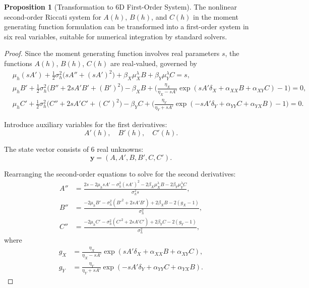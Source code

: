 \documentclass{article}
\theoremstyle{definition}
\newtheorem{proposition}{Proposition}[section]
\begin{document}
\begin{proposition}[Transformation to 6D First-Order System]
\label{prop:6d_transform}
The nonlinear second-order Riccati system for $A(h)$, $B(h)$, and $C(h)$ in the moment generating function formulation can be transformed into a first-order system in six real variables, suitable for numerical integration by standard solvers.
\end{proposition}

\begin{proof}
Since the moment generating function involves real parameters $s$, the functions $A(h)$, $B(h)$, $C(h)$ are real-valued, governed by
\[
\begin{aligned}
& \mu_h (s A') 
+ \tfrac{1}{2}\sigma_h^2 \big( s A'' + (s A')^2 \big)
+ \beta_X \mu_X^\lambda B 
+ \beta_Y \mu_Y^\lambda C 
= s, \\[0.8ex]
& \mu_h B' 
+ \tfrac{1}{2}\sigma_h^2 \big( B'' + 2 s A' B' + (B')^2 \big)
- \beta_X B 
+ \Big( \tfrac{\eta_X}{\eta_X - s A'} 
\exp\!\left( s A' \delta_X + \alpha_{XX} B + \alpha_{XY} C \right) - 1 \Big) 
= 0, \\[0.8ex]
& \mu_h C' 
+ \tfrac{1}{2}\sigma_h^2 \big( C'' + 2 s A' C' + (C')^2 \big)
- \beta_Y C 
+ \Big( \tfrac{\eta_Y}{\eta_Y + s A'} 
\exp\!\left( -s A' \delta_Y + \alpha_{YY} C + \alpha_{YX} B \right) - 1 \Big) 
= 0.
\end{aligned}
\]

Introduce auxiliary variables for the first derivatives:
\[
A'(h), \quad B'(h), \quad C'(h).
\]

The state vector consists of 6 real unknowns:
\[
\mathbf{y} = (A, A', B, B', C, C').
\]

Rearranging the second-order equations to solve for the second derivatives:
\[
\begin{aligned}
A'' &= \frac{2s - 2\mu_h s A' - \sigma_h^2 (s A')^2 - 2\beta_X \mu_X^\lambda B - 2\beta_Y \mu_Y^\lambda C}{\sigma_h^2 s}, \\[1ex]
B'' &= \frac{-2\mu_h B' - \sigma_h^2(B'^2 + 2 s A' B') + 2 \beta_X B - 2(g_X - 1)}{\sigma_h^2}, \\[1ex]
C'' &= \frac{-2\mu_h C' - \sigma_h^2(C'^2 + 2 s A' C') + 2 \beta_Y C - 2(g_Y - 1)}{\sigma_h^2},
\end{aligned}
\]
where
\[
\begin{aligned}
g_X &= \frac{\eta_X}{\eta_X - s A'} 
\exp\!\left( s A' \delta_X + \alpha_{XX} B + \alpha_{XY} C \right), \\
g_Y &= \frac{\eta_Y}{\eta_Y + s A'} 
\exp\!\left( -s A' \delta_Y + \alpha_{YY} C + \alpha_{YX} B \right).
\end{aligned}
\]


\end{proof}
\end{document}
